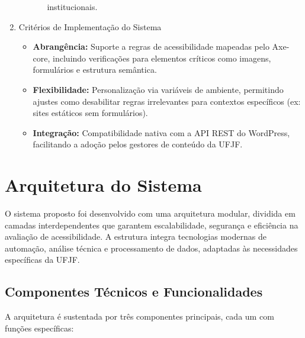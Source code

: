 \documentclass[12pt]{article}
\begin{document}
\begin{enumerate}
\begin{itemize}
\begin{itemize}
            institucionais.
        \end{itemize}
    \end{itemize}
    \item Critérios de Implementação do Sistema
    \begin{itemize}
        \item \textbf{Abrangência:} Suporte a regras de acessibilidade mapeadas pelo Axe-core,
        incluindo verificações para elementos críticos como imagens, formulários e
        estrutura semântica.
        \item \textbf{Flexibilidade:} Personalização via variáveis de ambiente, permitindo ajustes
        como desabilitar regras irrelevantes para contextos específicos (ex: sites
        estáticos sem formulários).
        \item \textbf{Integração:} Compatibilidade nativa com a API REST do WordPress, facilitando
        a adoção pelos gestores de conteúdo da UFJF.\@
    \end{itemize}
\end{enumerate}

\section{Arquitetura do Sistema}\label{sec:arquitetura}
O sistema proposto foi desenvolvido com uma arquitetura modular, dividida em
camadas interdependentes que garantem escalabilidade, segurança e eficiência na
avaliação de acessibilidade. A estrutura integra tecnologias modernas de automação,
análise técnica e processamento de dados, adaptadas às necessidades específicas da
UFJF.\@

\subsection{Componentes Técnicos e Funcionalidades}\label{subsec:componentes}
A arquitetura é sustentada por três componentes principais, cada um com funções
específicas:
\end{document}
